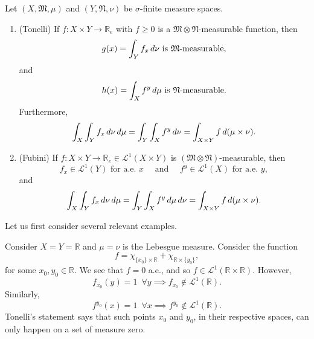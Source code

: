 \documentclass[notoc,notitlepage]{tufte-book}
\begin{document}
\begin{thm}\label{thm:fubini_tonelli_theorem}
  Let $(X, \mathfrak{M}, \mu)$ and $(Y, \mathfrak{N}, \nu)$
  be $\sigma$-finite measure spaces.
  \begin{enumerate}
    \item (Tonelli) If $f : X \times Y \to \mathbb{R}_e$ with $f \geq 0$
      is a $\mathfrak{M} \otimes \mathfrak{N}$-measurable function,
      then
      \begin{equation*}
        g(x) = \int_{Y} f_x \mathop{}\!d{\nu}
          \text{ is } \mathfrak{M}\text{-measurable},
      \end{equation*}
      and
      \begin{equation*}
        h(x) = \int_{X} f^y \mathop{}\!d{\mu}
          \text{ is } \mathfrak{N}\text{-measurable}.
      \end{equation*}
      Furthermore,
      \begin{equation*}
        \int_X \int_Y f_x \mathop{}\!d{\nu} \mathop{}\!d{\mu}
        = \int_Y \int_X f^y \mathop{}\!d{\nu}
        = \int_{X \times Y} f \mathop{}\!d{(\mu \times \nu)}.
      \end{equation*}

    \item (Fubini)
      If $f : X \times Y \to \mathbb{R}_e \in \mathcal{L}^1(X \times Y)$
      is $(\mathfrak{M} \otimes \mathfrak{N})$-measurable, then
      \begin{equation*}
        f_x \in \mathcal{L}^1(Y) \text{ for a.e. } x \quad\text{ and }\quad
        f^y \in \mathcal{L}^1(X) \text{ for a.e. } y,
      \end{equation*}
      and
      \begin{equation*}
        \int_X \int_Y f_x \mathop{}\!d{\nu} \mathop{}\!d{\mu}
        = \int_Y \int_X f^y \mathop{}\!d{\mu} \mathop{}\!d{\nu}
        = \int_{X \times Y} f \mathop{}\!d{(\mu \times \nu)}.
      \end{equation*}
  \end{enumerate}
\end{thm}

Let us first consider several relevant examples.

\begin{eg}
  Consider $X = Y = \mathbb{R}$ and $\mu = \nu$ is the Lebesgue measure.
  Consider the function
  \begin{equation*}
    f = \chi_{\{ x_0 \} \times \mathbb{R}} + \chi_{\mathbb{R} \times \{ y_0 \}},
  \end{equation*}
  for some $x_0, y_0 \in \mathbb{R}$.
  We see that $f = 0$ a.e.,
  and so $f \in \mathcal{L}^1(\mathbb{R} \times \mathbb{R})$.
  However,
  \begin{equation*}
    f_{x_0}(y) = 1 \enspace \forall y \implies f_{x_0}
      \notin \mathcal{L}^1(\mathbb{R}).
  \end{equation*}
  Similarly,
  \begin{equation*}
    f^{y_0}(x) = 1 \enspace \forall x \implies f^{y_0}
      \notin \mathcal{L}^1(\mathbb{R}).
  \end{equation*}
  Tonelli's statement says that such points $x_0$ and $y_0$,
  in their respective spaces, can only happen on a set of measure zero.
\end{eg}
\end{document}
